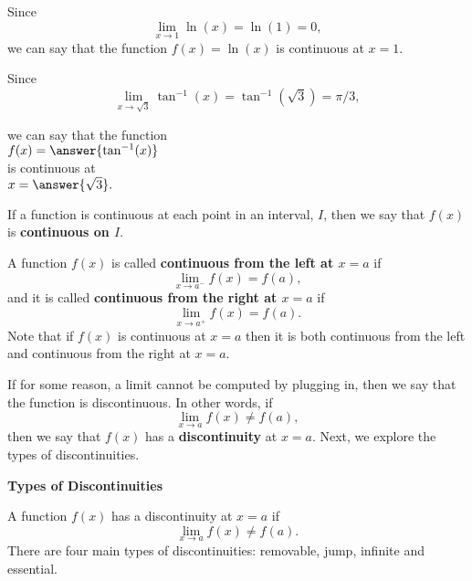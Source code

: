 \documentclass{ximera}
\begin{document}
\begin{example}
Since
\[\lim_{x \to 1} \ln(x) = \ln(1) = 0,\]
we can say that the function $f(x) = \ln(x)$ is continuous at $x = 1$.
\end{example}

\begin{problem}
Since
\[\lim_{x \to \sqrt 3} \tan^{-1}(x) = \tan^{-1}(\sqrt 3) = \pi/3,\]
\begin{center}
we can say that the function \\
$f(x) = \answer{\tan^{-1}(x)}$ \\
is continuous at \\
$x = \answer{\sqrt 3}.$
\end{center}
\end{problem}

If a function is continuous at each point in an interval, $I$, then we say that $f(x)$ is \textbf{continuous on $I$}.

A function $f(x)$ is called \textbf{continuous from the left at $x=a$} if 
\[\lim_{x \to a^-} f(x) = f(a),\]
and it is called \textbf{continuous from the right at $x = a$} if
\[\lim_{x \to a^+} f(x) = f(a).\]
Note that if $f(x)$ is continuous at $x=a$ then it is both continuous from the left and 
continuous from the right at $x = a$.

If for some reason, a limit cannot be computed by plugging in, then we say that the function is discontinuous.
In other words, if
\[\lim_{x \to a} f(x) \neq f(a),\]
then we say that $f(x)$ has a \textbf{discontinuity} at $x = a$.
Next, we explore the types of discontinuities.







\begin{center}
\textbf{Types of Discontinuities}
\end{center}

A function $f(x)$ has a discontinuity at $x = a$ if
\[\lim_{x \to a} f(x) \neq f(a).\]
There are four main types of discontinuities: removable, jump, infinite and essential. 
\end{document}
